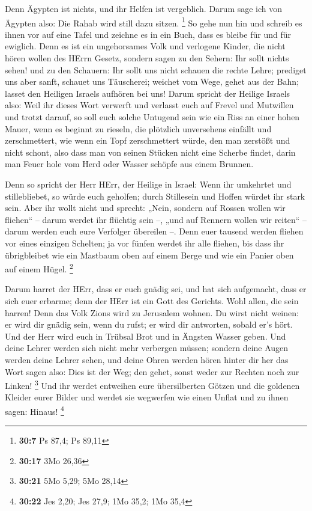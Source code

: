  Denn Ägypten ist nichts, und ihr Helfen ist vergeblich.
Darum sage ich von Ägypten also: Die Rahab wird still dazu sitzen.
\footnote{\textbf{30:7} Ps 87,4; Ps 89,11}  So gehe nun hin
und schreib es ihnen vor auf eine Tafel und zeichne es in ein Buch, dass
es bleibe für und für ewiglich.  Denn es ist ein
ungehorsames Volk und verlogene Kinder, die nicht hören wollen des HErrn
Gesetz,  sondern sagen zu den Sehern: Ihr sollt nichts
sehen! und zu den Schauern: Ihr sollt uns nicht schauen die rechte
Lehre; prediget uns aber sanft, schauet uns Täuscherei; 
weichet vom Wege, gehet aus der Bahn; lasset den Heiligen Israels
aufhören bei uns!  Darum spricht der Heilige Israels also:
Weil ihr dieses Wort verwerft und verlasst euch auf Frevel und Mutwillen
und trotzt darauf,  so soll euch solche Untugend sein wie
ein Riss an einer hohen Mauer, wenn es beginnt zu rieseln, die plötzlich
unversehens einfällt und zerschmettert,  wie wenn ein Topf
zerschmettert würde, den man zerstößt und nicht schont, also dass man
von seinen Stücken nicht eine Scherbe findet, darin man Feuer hole vom
Herd oder Wasser schöpfe aus einem Brunnen.

 Denn so spricht der Herr HErr, der Heilige in Israel: Wenn
ihr umkehrtet und stillebliebet, so würde euch geholfen; durch
Stillesein und Hoffen würdet ihr stark sein. Aber ihr wollt nicht
 und sprecht: „Nein, sondern auf Rossen wollen wir
fliehen`` -- darum werdet ihr flüchtig sein --, „und auf Rennern wollen
wir reiten`` -- darum werden euch eure Verfolger übereilen --.
 Denn euer tausend werden fliehen vor eines einzigen
Schelten; ja vor fünfen werdet ihr alle fliehen, bis dass ihr
übrigbleibet wie ein Mastbaum oben auf einem Berge und wie ein Panier
oben auf einem Hügel. \footnote{\textbf{30:17} 3Mo 26,36}

 Darum harret der HErr, dass er euch gnädig sei, und hat
sich aufgemacht, dass er sich euer erbarme; denn der HErr ist ein Gott
des Gerichts. Wohl allen, die sein harren!  Denn das Volk
Zions wird zu Jerusalem wohnen. Du wirst nicht weinen: er wird dir
gnädig sein, wenn du rufst; er wird dir antworten, sobald er's hört.
 Und der Herr wird euch in Trübsal Brot und in Ängsten
Wasser geben. Und deine Lehrer werden sich nicht mehr verbergen müssen;
sondern deine Augen werden deine Lehrer sehen,  und deine
Ohren werden hören hinter dir her das Wort sagen also: Dies ist der Weg;
den gehet, sonst weder zur Rechten noch zur Linken! \footnote{\textbf{30:21}
  5Mo 5,29; 5Mo 28,14}  Und ihr werdet entweihen eure
übersilberten Götzen und die goldenen Kleider eurer Bilder und werdet
sie wegwerfen wie einen Unflat und zu ihnen sagen: Hinaus! \footnote{\textbf{30:22}
  Jes 2,20; Jes 27,9; 1Mo 35,2; 1Mo 35,4}

